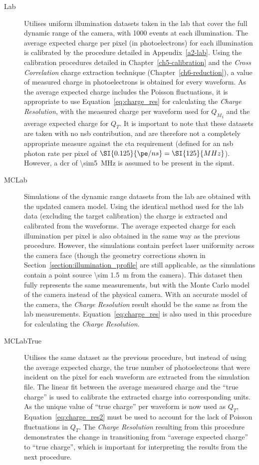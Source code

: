 \begin{description}
\item [Lab] Utilises uniform illumination datasets taken in the lab that cover the full dynamic range of the camera, with 1000 events at each illumination. The average expected charge per pixel (in photoelectrons) for each illumination is calibrated by the procedure detailed in Appendix~\ref{a2-lab}. Using the calibration procedures detailed in Chapter~\ref{ch5-calibration} and the \textit{Cross Correlation} charge extraction technique (Chapter~\ref{ch6-reduction}), a value of measured charge in photoelectrons is obtained for every waveform. As the average expected charge includes the Poisson fluctuations, it is appropriate to use Equation~\ref{eq:charge_res} for calculating the \textit{Charge Resolution}, with the measured charge per waveform used for ${Q_M}_i$ and the average expected charge for $Q_T$. It is important to note that these datasets are taken with no \gls{nsb} contribution, and are therefore not a completely appropriate measure against the \gls{cta} requirement (defined for an \gls{nsb} photon rate per pixel of $\SI{0.125}{\pe/ns} = \SI{125}{MHz}$). However, a \gls{dcr} of \SI{\sim5}{MHz} is assumed to be present in the \gls{sipmt}.
\item [MCLab] Simulations of the dynamic range datasets from the lab are obtained with the updated  camera model. Using the identical method used for the lab data (excluding the \gls{target} calibration) the charge is extracted and calibrated from the waveforms. The average expected charge for each illumination per pixel is also obtained in the same way as the previous procedure. However, the simulations contain perfect laser uniformity across the camera face (though the geometry corrections shown in Section~\ref{section:illumination_profile} are still applicable, as the simulations contain a point source \SI{\sim 1.5}{m} from the camera). This dataset then fully represents the same measurements, but with the Monte Carlo model of the camera instead of the physical camera. With an accurate model of the camera, the \textit{Charge Resolution} result should be the same as from the lab measurements. Equation~\ref{eq:charge_res} is also used in this procedure for calculating the \textit{Charge Resolution}.
\item [MCLabTrue] Utilises the same dataset as the previous procedure, but instead of using the average expected charge, the true number of photoelectrons that were incident on the pixel for each waveform are extracted from the simulation file. The linear fit between the average measured charge and the ``true charge'' is used to calibrate the extracted charge into corresponding units. As the unique value of ``true charge'' per waveform is now used as $Q_T$, Equation~\ref{eq:charge_res2} must be used to account for the lack of Poisson fluctuations in $Q_T$. The \textit{Charge Resolution} resulting from this procedure demonstrates the change in transitioning from ``average expected charge'' to ``true charge'', which is important for interpreting the results from the next procedure.

\end{description}

